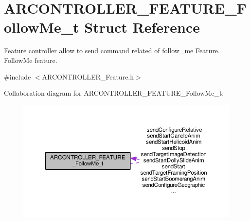 \hypertarget{struct_a_r_c_o_n_t_r_o_l_l_e_r___f_e_a_t_u_r_e___follow_me__t}{}\section{A\+R\+C\+O\+N\+T\+R\+O\+L\+L\+E\+R\+\_\+\+F\+E\+A\+T\+U\+R\+E\+\_\+\+Follow\+Me\+\_\+t Struct Reference}
\label{struct_a_r_c_o_n_t_r_o_l_l_e_r___f_e_a_t_u_r_e___follow_me__t}


Feature controller allow to send command related of follow\+\_\+me Feature. Follow\+Me feature.  




{\ttfamily \#include $<$A\+R\+C\+O\+N\+T\+R\+O\+L\+L\+E\+R\+\_\+\+Feature.\+h$>$}



Collaboration diagram for A\+R\+C\+O\+N\+T\+R\+O\+L\+L\+E\+R\+\_\+\+F\+E\+A\+T\+U\+R\+E\+\_\+\+Follow\+Me\+\_\+t\+:
\nopagebreak
\begin{figure}[H]
\begin{center}
\leavevmode
\includegraphics[width=350pt]{struct_a_r_c_o_n_t_r_o_l_l_e_r___f_e_a_t_u_r_e___follow_me__t__coll__graph}
\end{center}
\end{figure}
